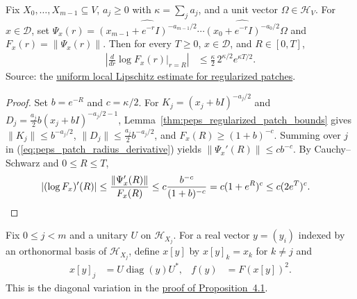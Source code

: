 \begin{lemma}
    \label{thm:peps_patch_uniform_log_radius_derivative}
    Fix $X_0,\ldots,X_{m-1}\subseteq V$, $a_j\ge0$ with $\kappa=\sum_j a_j$,
    and a unit vector $\Omega\in\mathcal H_V$.
    For $x\in\mathcal D$, set
    $\Psi_x(r)=\widehat{(x_{m-1}+e^{-r}I)^{-a_{m-1}/2}}\cdots\widehat{(x_0+e^{-r}I)^{-a_0/2}}\Omega$
    and $F_x(r)=\|\Psi_x(r)\|$.
    Then for every $T\ge0$, $x\in\mathcal D$, and $R\in[0,T]$,
    \begin{align}
        \left|\frac{d}{dr}\log F_x(r)\bigg|_{r=R}\right|
         & \leq \frac{\kappa}{2}\,2^{\kappa/2}e^{\kappa T/2}.
        \label{eq:peps_patch_uniform_log_radius_derivative}
    \end{align}
    Source: the
    \href{https://github.com/openai/math/blob/adc7f1241b42e322a6451854ab7e4b4c146bf78a/preprints/Polynomial-PEPS-approximation-of-gapped-square-grid-ground-states-September-24-2026/build/sections/03-patches.tex\#L433-L451}{uniform local Lipschitz estimate for regularized patches}.
\end{lemma}
\begin{proof}
    Set $b=e^{-R}$ and $c=\kappa/2$.
    For $K_j=(x_j+bI)^{-a_j/2}$ and $D_j=\frac{a_j}{2}b(x_j+bI)^{-a_j/2-1}$, Lemma~\ref{thm:peps_regularized_patch_bounds} gives
    $\|K_j\|\le b^{-a_j/2}$, $\|D_j\|\le\frac{a_j}{2}b^{-a_j/2}$, and $F_x(R)\ge(1+b)^{-c}$.
    Summing over $j$ in (\ref{eq:peps_patch_radius_derivative}) yields $\|\Psi_x'(R)\|\le c b^{-c}$.
    By Cauchy--Schwarz and $0\le R\le T$,
    \begin{align}
        |(\log F_x)'(R)|
         & \leq\frac{\|\Psi_x'(R)\|}{F_x(R)}
        \leq c\frac{b^{-c}}{(1+b)^{-c}}
        =c(1+e^R)^c
        \le c(2e^T)^c.\notag
    \end{align}
\end{proof}

\begin{definition}
    \label{def:peps_patch_diagonal_objective}
    \leanok
    Fix $0\le j<m$ and a unitary $U$ on $\mathcal H_{X_j}$.
    For a real vector $y=(y_i)$ indexed by an orthonormal basis of $\mathcal H_{X_j}$,
    define $x[y]$ by $x[y]_k=x_k$ for $k\ne j$ and
    \begin{align}
        x[y]_j & =U\operatorname{diag}(y)U^*, &
        f(y)   & =F(x[y])^2.
        \label{eq:peps_patch_diagonal_objective}
    \end{align}
    This is the diagonal variation in the
    \href{https://github.com/openai/math/blob/adc7f1241b42e322a6451854ab7e4b4c146bf78a/preprints/Polynomial-PEPS-approximation-of-gapped-square-grid-ground-states-September-24-2026/build/sections/03-patches.tex\#L170-L191}{proof of Proposition~4.1}.
\end{definition}

